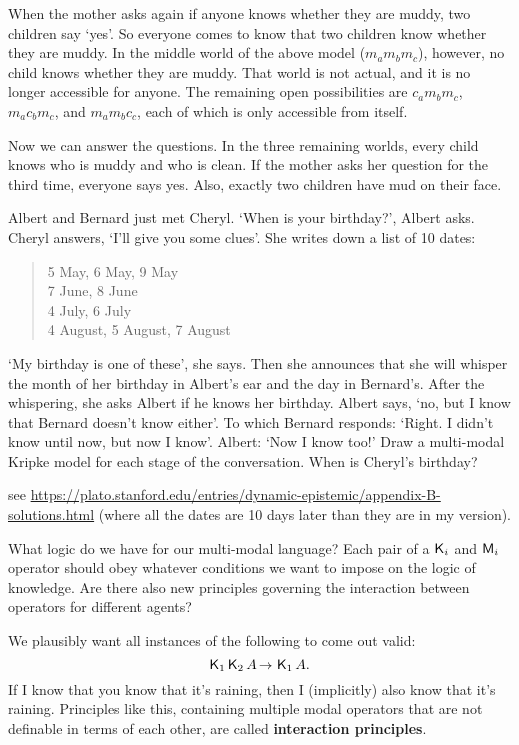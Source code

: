 When the mother asks again if anyone knows whether they are muddy, two children
say `yes'. So everyone comes to know that two children know whether they are
muddy. In the middle world of the above model ($m_am_bm_c$), however, no child
knows whether they are muddy. That world is not actual, and it is no longer
accessible for anyone. The remaining open possibilities are $c_am_bm_c$,
$m_ac_bm_c$, and $m_am_bc_c$, each of which is only accessible from itself.

Now we can answer the questions. In the three remaining worlds, every child
knows who is muddy and who is clean. If the mother asks her question for the
third time, everyone says yes. Also, exactly two children have mud on their
face.

\begin{exercise}
  Albert and Bernard just met Cheryl. `When is your birthday?', Albert asks.
  Cheryl answers, `I'll give you some clues'. She writes down a list of 10
  dates:
  \begin{quote}
    5 May, 6 May, 9 May\\
    7 June, 8 June\\
    4 July, 6 July\\
    4 August, 5 August, 7 August
  \end{quote}
  `My birthday is one of these', she says. Then she announces that she will
  whisper the month of her birthday in Albert's ear and the day in Bernard's.
  After the whispering, she asks Albert if he knows her birthday. Albert says,
  `no, but I know that Bernard doesn't know either'. To which Bernard responds:
  `Right. I didn't know until now, but now I know'. Albert: `Now I know too!'
  Draw a multi-modal Kripke model for each stage of the conversation. When is
  Cheryl's birthday?
\end{exercise}
\begin{solution}
  see
  \href{https://plato.stanford.edu/entries/dynamic-epistemic/appendix-B-solutions.html}{https://plato.stanford.edu/entries/dynamic-epistemic/appendix-B-solutions.html} (where all the dates are 10 days later than they are in my version).
\end{solution}

What logic do we have for our multi-modal language? Each pair of a $\operatorname{\mathsf{K}{}}_{i}$ and
$\operatorname{\mathsf{M}}_{i}$ operator should obey whatever conditions we want to impose on the
logic of knowledge. Are there also new principles governing the interaction
between operators for different agents?

We plausibly want all instances of the following to come out valid:
\[
  \Kn_1 \Kn_2 A \to \Kn_1 A.
\]
If I know that you know that it's raining, then I (implicitly) also know that
it's raining. Principles like this, containing multiple modal operators that are
not definable in terms of each other, are called \textbf{interaction
  principles}.

